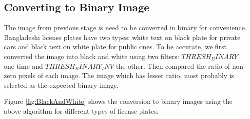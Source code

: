 \documentclass{standalone}
\begin{document}
\subsection{Converting to Binary Image}
The image from previous stage is need to be converted in binary for convenience. Bangladeshi license plates have two types: white text on black plate for private cars and black text on white plate for public ones. To be accurate, we first converted the image into black and white using two filters: $THRESH_BINARY$ one time and $THRESH_BINARY_INV$ the other. Then compared the ratio of non-zero pixels of each image. The image which has lesser ratio, most probably is selected as the expected binary image. 

Figure \ref{fig:BlackAndWhite} shows the conversion to binary images using the above algorithm for different types of license plates.
\end{document}

